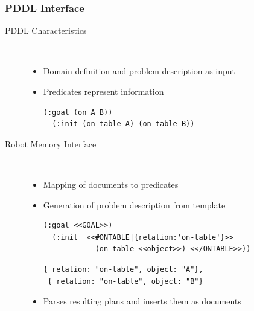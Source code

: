 \begin{frame}[fragile]
  \frametitle{PDDL Interface}
  \begin{description}
  \item[PDDL Characteristics]%
                \hfill \\
    \begin{itemize}
    \item Domain definition and problem description as input %
    \item Predicates represent information
\begin{lstlisting}[style=SmallSlidePDDL,
  framexleftmargin=1pt, xleftmargin=1pt,linewidth=9.5cm,
 morekeywords={}, numbers=none]
  (:goal (on A B))
  (:init (on-table A) (on-table B))
\end{lstlisting}
    \end{itemize}
  \item[Robot Memory Interface]%
                \hfill \\
    \begin{itemize}
    \item Mapping of documents to predicates
    \item Generation of problem description from template
\begin{lstlisting}[style=SmallSlidePDDL,
  framexleftmargin=1pt, xleftmargin=1pt,linewidth=9.5cm,
 morekeywords={}, numbers=none]
  (:goal <<GOAL>>)
  (:init  <<#ONTABLE|{relation:'on-table'}>>
            (on-table <<object>>) <</ONTABLE>>))
\end{lstlisting}
\begin{lstlisting}[style=SmallJSON,
  framexleftmargin=0pt, xleftmargin=0pt,linewidth=9.5cm,
 morekeywords={}, numbers=none]
 { relation: "on-table", object: "A"},
 { relation: "on-table", object: "B"}
\end{lstlisting}
    \item Parses resulting plans and inserts them as documents %
    \end{itemize}
  \end{description}
\end{frame}

